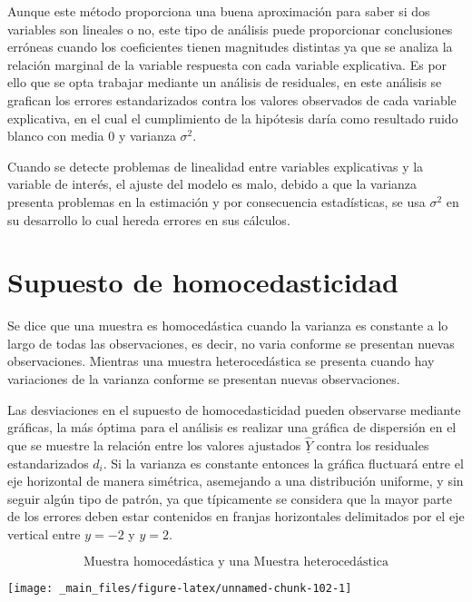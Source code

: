 \documentclass[
  a4paper,
  oneside,
  openany]{book}
\begin{document}
Aunque este método proporciona una buena aproximación para saber si dos variables son lineales o no, este tipo de análisis puede proporcionar conclusiones erróneas cuando los coeficientes tienen magnitudes distintas ya que se analiza la relación marginal de la variable respuesta con cada variable explicativa. Es por ello que se opta trabajar mediante un análisis de residuales, en este análisis se grafican los errores estandarizados contra los valores observados de cada variable explicativa, en el cual el cumplimiento de la hipótesis daría como resultado ruido blanco con media 0 y varianza \(\sigma^2.\)

Cuando se detecte problemas de linealidad entre variables explicativas y la variable de interés, el ajuste del modelo es malo, debido a que la varianza presenta problemas en la estimación y por consecuencia estadísticas, se usa \(\sigma^2\) en su desarrollo lo cual hereda errores en sus cálculos.

\hypertarget{supuesto-de-homocedasticidad}{%
\section{Supuesto de homocedasticidad}\label{supuesto-de-homocedasticidad}}

Se dice que una muestra es homocedástica cuando la varianza es constante a lo largo de todas las observaciones, es decir, no varia conforme se presentan nuevas observaciones. Mientras una muestra heterocedástica se presenta cuando hay variaciones de la varianza conforme se presentan nuevas observaciones.

Las desviaciones en el supuesto de homocedasticidad pueden observarse mediante gráficas, la más óptima para el análisis es realizar una gráfica de dispersión en el que se muestre la relación entre los valores ajustados \(\underline{\hat{Y}}\) contra los residuales estandarizados \(d_{i}\). Si la varianza es constante entonces la gráfica fluctuará entre el eje horizontal de manera simétrica, asemejando a una distribución uniforme, y sin seguir algún tipo de patrón, ya que típicamente se considera que la mayor parte de los errores deben estar contenidos en franjas horizontales delimitados por el eje vertical entre \(y=-2\) y \(y=2\).

\[\mbox{Muestra homocedástica y una Muestra heterocedástica}\]

\begin{center}\texttt{[image: \_main\_files/figure-latex/unnamed-chunk-102-1]} \end{center}
\end{document}
